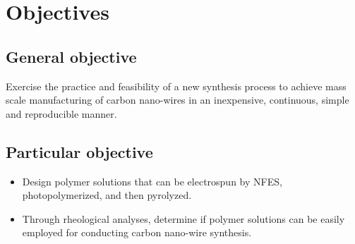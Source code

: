 
\chapter{Objectives} %

\label{Chapter:Objectives}

\section{General objective}
Exercise the practice and feasibility of a new synthesis process to achieve mass scale manufacturing of carbon nano-wires in an inexpensive, continuous, simple and reproducible manner.

\section{Particular objective}

\begin{itemize}
	\item{
Design polymer solutions that can be electrospun by NFES, photopolymerized, and then pyrolyzed.
    }
    \item{
    Through rheological analyses, determine if polymer solutions can be easily employed for conducting carbon nano-wire synthesis.    
    }
\end{itemize}




